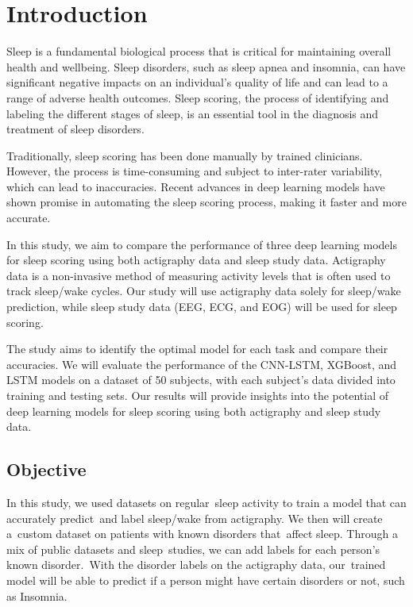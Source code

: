 \documentclass[12pt]{report}
\begin{document}
\normalem       %


\chapter{Introduction}

Sleep is a fundamental biological process that is critical for maintaining overall health and wellbeing. Sleep disorders, such as sleep apnea and insomnia, can have significant negative impacts on an individual's quality of life and can lead to a range of adverse health outcomes. Sleep scoring, the process of identifying and labeling the different stages of sleep, is an essential tool in the diagnosis and treatment of sleep disorders.

Traditionally, sleep scoring has been done manually by trained clinicians. However, the process is time-consuming and subject to inter-rater variability, which can lead to inaccuracies. Recent advances in deep learning models have shown promise in automating the sleep scoring process, making it faster and more accurate.

In this study, we aim to compare the performance of three deep learning models for sleep scoring using both actigraphy data and sleep study data. Actigraphy data is a non-invasive method of measuring activity levels that is often used to track sleep/wake cycles. Our study will use actigraphy data solely for sleep/wake prediction, while sleep study data (EEG, ECG, and EOG) will be used for sleep scoring.

The study aims to identify the optimal model for each task and compare their accuracies. We will evaluate the performance of the CNN-LSTM, XGBoost, and LSTM models on a dataset of 50 subjects, with each subject's data divided into training and testing sets. Our results will provide insights into the potential of deep learning models for sleep scoring using both actigraphy and sleep study data. 

\section{Objective}

In this study, we used datasets on regular sleep activity to train a model that can accurately predict and label sleep/wake from actigraphy. We then will create a custom dataset on patients with known disorders that affect sleep. Through a mix of public datasets and sleep studies, we can add labels for each person's known disorder. With the disorder labels on the actigraphy data, our trained model will be able to predict if a person might have certain disorders or not, such as Insomnia.
\end{document}
